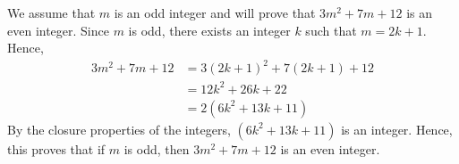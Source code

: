 %

\begin{list}{\bf{\ref{exer:3m2}.}}
\item \begin{list}{\bf{(b)}} 
\item We assume that $m$ is an odd integer and will prove that $3m^2 + 7m + 12$ is an even integer.  Since $m$ is odd, there exists an integer $k$ such that $m = 2k +1$.  Hence,
\begin{align*}
3m^2 + 7m + 12 &= 3 \left( 2k + 1 \right)^2 + 7 \left( 2k + 1 \right) + 12 \\
              &= 12k^2 + 26k + 22 \\
              &= 2 \left( 6k^2 + 13k + 11 \right)
\end{align*}
By the closure properties of the integers, $\left( 6k^2 + 13k + 11 \right)$ is an integer.  Hence, this proves that if $m$ is odd, then $3m^2 + 7m + 12$ is an even integer.
\end{list}
\end{list}




